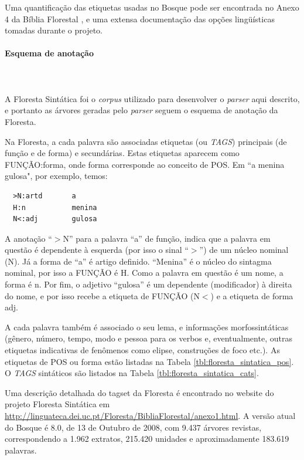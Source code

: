 Uma quantificação das etiquetas usadas no Bosque pode ser encontrada no Anexo 4 da Bíblia Florestal \cite{florestasintatica}, e uma extensa documentação das opções lingüísticas tomadas durante o projeto.


\paragraph{Esquema de anotação}\label{par:corpus_bosque_esquema}\hspace*{1in}\\ \\

A Floresta Sintática foi o \emph{corpus} utilizado para desenvolver o \emph{parser} aqui descrito, e portanto as árvores geradas pelo \emph{parser} seguem o esquema de anotação da Floresta.

Na Floresta, a cada palavra são associadas etiquetas (ou \emph{TAGS}) principais (de função e de forma) e secundárias. Estas etiquetas aparecem como FUNÇÃO:forma, onde forma corresponde ao conceito de POS. Em ``a menina gulosa", por exemplo, temos:


\begin{verbatim}
  >N:artd       a
  H:n           menina
  N<:adj        gulosa
\end{verbatim}

A anotação ``$>$N'' para a palavra ``a'' de função, indica que a palavra em questão é dependente à esquerda (por isso o sinal ``$>$'') de um núcleo nominal (N). Já a forma de ``a'' é artigo definido. ``Menina'' é o núcleo do sintagma nominal, por isso a FUNÇÃO é H. Como a palavra em questão é um nome, a forma é n. Por fim, o adjetivo ``gulosa'' é um dependente (modificador) à direita do nome, e por isso recebe a etiqueta de FUNÇÃO (N$<$) e a etiqueta de forma adj.

A cada palavra também é associado o seu lema, e informações morfossintáticas (gênero, número, tempo, modo e pessoa para os verbos e, eventualmente, outras etiquetas indicativas de fenômenos como elipse, construções de foco etc.). As etiquetas de POS ou forma estão listadas na Tabela \ref{tbl:floresta_sintatica_pos}. O \emph{TAGS} sintáticos são listados na Tabela \ref{tbl:floresta_sintatica_cats}.

Uma descrição detalhada do tagset da Floresta é encontrado no website do projeto Floresta Sintática em \url{http://linguateca.dei.uc.pt/Floresta/BibliaFlorestal/anexo1.html}. A versão atual do Bosque é 8.0, de 13 de Outubro de 2008, com 9.437 árvores revistas, correspondendo a 1.962 extratos, 215.420 unidades e aproximadamente 183.619 palavras.

